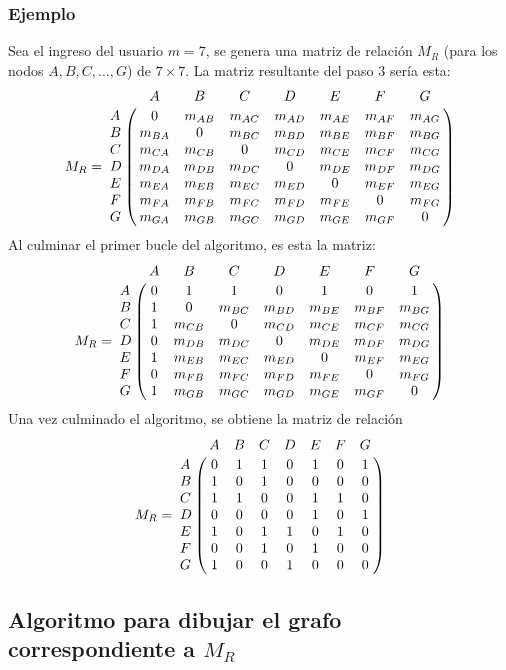 \documentclass[12pt]{article}
\begin{document}
\subsubsection*{Ejemplo}
Sea el ingreso del usuario $m=7$, se genera una matriz de relaci\'{o}n $M_{R}$ (para los nodos $A, B, C, ..., G$) de $7\times 7$. La matriz resultante del paso 3 ser\'{i}a esta:
$$M_{R}=
\bordermatrix{
     &     A     &     B          &     C          &     D          &     E          &     F          &     G          \cr
A    &     0     &     m_{AB}     &     m_{AC}     &     m_{AD}     &     m_{AE}     &     m_{AF}     &     m_{AG}     \cr
B    &     m_{BA}&     0          &     m_{BC}     &     m_{BD}     &     m_{BE}     &     m_{BF}     &     m_{BG}     \cr
C    &     m_{CA}&     m_{CB}     &     0          &     m_{CD}     &     m_{CE}     &     m_{CF}     &     m_{CG}     \cr
D    &     m_{DA}&     m_{DB}     &     m_{DC}     &     0          &     m_{DE}     &     m_{DF}     &     m_{DG}     \cr
E    &     m_{EA}&     m_{EB}     &     m_{EC}     &     m_{ED}     &     0          &     m_{EF}     &     m_{EG}     \cr
F    &     m_{FA}&     m_{FB}     &     m_{FC}     &     m_{FD}     &     m_{FE}     &     0          &     m_{FG}     \cr
G    &     m_{GA}&     m_{GB}     &     m_{GC}     &     m_{GD}     &     m_{GE}     &     m_{GF}     &     0     \cr
}
$$
Al culminar el primer bucle del algoritmo, es esta la matriz:
$$M_{R}=
\bordermatrix{
     &     A     &     B          &     C          &     D          &     E          &     F          &     G          \cr
A    &     0     &     1          &     1          &     0          &     1          &     0          &     1          \cr
B    &     1     &     0          &     m_{BC}     &     m_{BD}     &     m_{BE}     &     m_{BF}     &     m_{BG}     \cr
C    &     1     &     m_{CB}     &     0          &     m_{CD}     &     m_{CE}     &     m_{CF}     &     m_{CG}     \cr
D    &     0     &     m_{DB}     &     m_{DC}     &     0          &     m_{DE}     &     m_{DF}     &     m_{DG}     \cr
E    &     1     &     m_{EB}     &     m_{EC}     &     m_{ED}     &     0          &     m_{EF}     &     m_{EG}     \cr
F    &     0     &     m_{FB}     &     m_{FC}     &     m_{FD}     &     m_{FE}     &     0          &     m_{FG}     \cr
G    &     1     &     m_{GB}     &     m_{GC}     &     m_{GD}     &     m_{GE}     &     m_{GF}     &     0     \cr
}
$$
Una vez culminado el algoritmo, se obtiene la matriz de relaci\'{o}n
$$M_{R}=
\bordermatrix{
 &A&B&C&D&E&F&G\cr
A&0&1&1&0&1&0&1\cr
B&1&0&1&0&0&0&0\cr
C&1&1&0&0&1&1&0\cr
D&0&0&0&0&1&0&1\cr
E&1&0&1&1&0&1&0\cr
F&0&0&1&0&1&0&0\cr
G&1&0&0&1&0&0&0\cr
}
$$
\subsection{Algoritmo para dibujar el grafo correspondiente a $M_{R}$}
\end{document}
